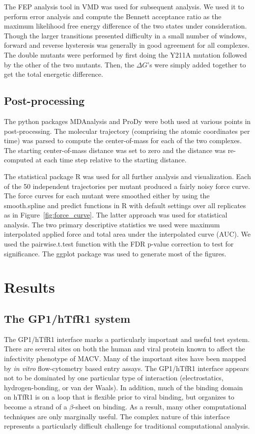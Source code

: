 \documentclass[12pt]{article}
\begin{document}
The FEP analysis tool in VMD was used for subsequent analysis. We used it to perform error analysis and compute the Bennett acceptance ratio as the maximum likelihood free energy difference of the two states under consideration. Though the larger transitions presented difficulty in a small number of windows, forward and reverse hysteresis was generally in good agreement for all complexes. The double mutants were performed by first doing the Y211A mutation followed by the other of the two mutants. Then, the $\Delta G$'s were simply added together to get the total energetic difference.

\subsection{Post-processing}

The python packages MDAnalysis \citep{Agrawal2011} and ProDy \citep{Bakan2011} were both used at various points in post-processing. The molecular trajectory (comprising the atomic coordinates per time) was parsed to compute the center-of-mass for each of the two complexes. The starting center-of-mass distance was set to zero and the distance was re-computed at each time step relative to the starting distance. 

The statistical package R was used for all further analysis and visualization. Each of the 50 independent trajectories per mutant produced a fairly noisy force curve. The force curves for each mutant were smoothed either by using the smooth.spline and predict functions in R with default settings over all replicates as in Figure~\ref{fig:force_curve}. The latter approach was used for statistical analysis. The two primary descriptive statistics we used were maximum interpolated applied force and total area under the interpolated curve (AUC). We used the pairwise.t.test function with the FDR p-value correction to test for significance. The ggplot \citep{ggplot} package was used to generate most of the figures. 

\section{Results}

\subsection{The GP1/hTfR1 system}
The GP1/hTfR1 interface marks a particularly important and useful test system. There are several sites on both the human and viral protein known to affect the infectivity phenotype of MACV. Many of the important sites have been mapped by \textit{in vitro} flow-cytometry based entry assays. The GP1/hTfR1 interface appears not to be dominated by one particular type of interaction (electrostatics, hydrogen-bonding, or van der Waals). In addition, much of the binding domain on hTfR1 is on a loop that is flexible prior to viral binding, but organizes to become a strand of a $\beta$-sheet on binding. As a result,  many other computational techniques \citep{Grant2011,Kortemme2004} are only marginally useful. The complex nature of this interface represents a particularly difficult challenge for traditional computational analysis. 
\end{document}
